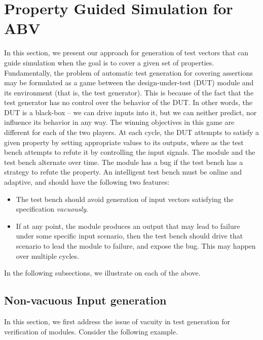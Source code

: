 \documentclass[a4paper, 11pt]{article}
\begin{document}
\section{Property Guided Simulation for ABV} \label{sec4}
In this section, we present our approach for generation of test vectors 
that can guide simulation when the goal is to cover a given set of properties. 
Fundamentally, the problem of automatic test generation for covering assertions
may be formulated as a game between the design-under-test (DUT) module 
and its environment (that is, the
test generator). This is because of the fact that the test generator has no
control over the behavior of the DUT. In other words, the DUT is a black-box
-- we can drive inputs into it, but we can neither predict, nor influence its
behavior in any way. The winning objectives in this game are different 
for each of the two players. At each cycle, the DUT attempts to satisfy a given 
property by setting appropriate values to its outputs, where as the test 
bench attempts to refute it by controlling the input signals. The module and 
the test bench alternate over time. The module has a bug if the test bench has a
strategy to refute the property.
An intelligent test bench must be online and adaptive, and should have the
following two features:

\begin{itemize}

\item The test bench should avoid generation of input vectors satisfying 
      the specification {\em vacuously}.

\item If at any point, the module produces an output that may lead to
      failure under some specific input scenario, then the test bench should
      drive that scenario to lead the module to failure, and
      expose the bug. This may happen over multiple cycles.

\end{itemize}

\noindent
In the following subsections, we illustrate on each of the above.

\subsection{Non-vacuous Input generation} \label{sec4.1}
\noindent
In this section, we first address the issue of vacuity
in test generation for verification of modules. Consider the following 
example.
\end{document}
